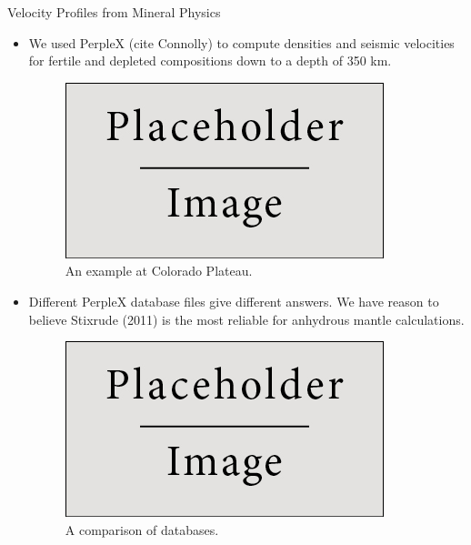 \documentclass[final]{beamer}
\newlength{\onecolwid}
\newlength{\twocolwid}
\begin{document}
\begin{frame}[t]
\begin{columns}[t]
\begin{column}{\twocolwid}
\begin{columns}[t,totalwidth=\twocolwid]
\begin{column}{\onecolwid}
\begin{block}{Velocity Profiles from Mineral Physics}

\begin{itemize}

\item We used PerpleX (cite Connolly) to compute densities and seismic velocities for fertile and depleted compositions down to a depth of 350 km.

\begin{figure}
\includegraphics{img/placeholder.jpg}
\caption{An example at Colorado Plateau.}
\end{figure}

\item Different PerpleX database files give different answers.  We have reason to believe Stixrude (2011) is the most reliable for anhydrous mantle calculations.

\begin{figure}
\includegraphics{img/placeholder.jpg}
\caption{A comparison of databases.}
\end{figure}


\end{itemize}

\end{block}


\end{column} %


\end{columns}
\end{column}
\end{columns}
\end{frame}
\end{document}

